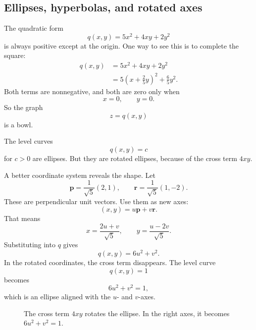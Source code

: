 \subsection{Ellipses, hyperbolas, and rotated axes}

The quadratic form
\[
    q(x,y)=5x^2+4xy+2y^2
\]
is always positive except at the origin.  One way to see this is to complete the square:
\[
\begin{aligned}
    q(x,y)
    &=
    5x^2+4xy+2y^2\\
    &=
    5\left(x+\frac25y\right)^2+\frac65y^2.
\end{aligned}
\]
Both terms are nonnegative, and both are zero only when
\[
    x=0,\qquad y=0.
\]
So the graph
\[
    z=q(x,y)
\]
is a bowl.

The level curves
\[
    q(x,y)=c
\]
for \(c>0\) are ellipses.  But they are rotated ellipses, because of the cross term
\(4xy\).

A better coordinate system reveals the shape.  Let
\[
    \mathbf p=\frac1{\sqrt5}(2,1),
    \qquad
    \mathbf r=\frac1{\sqrt5}(1,-2).
\]
These are perpendicular unit vectors.  Use them as new axes:
\[
    (x,y)=u\mathbf p+v\mathbf r.
\]
That means
\[
    x=\frac{2u+v}{\sqrt5},
    \qquad
    y=\frac{u-2v}{\sqrt5}.
\]
Substituting into \(q\) gives
\[
\boxed{
    q(x,y)=6u^2+v^2.
}
\]
In the rotated coordinates, the cross term disappears.  The level curve
\[
    q(x,y)=1
\]
becomes
\[
    6u^2+v^2=1,
\]
which is an ellipse aligned with the \(u\)- and \(v\)-axes.

\begin{figure}[h]
\centering
{}
\caption{The cross term \(4xy\) rotates the ellipse.  In the right axes, it becomes
\(6u^2+v^2=1\).}
\end{figure}

